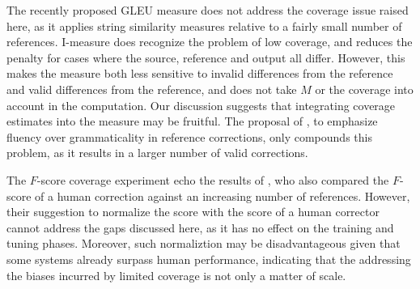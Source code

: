 \documentclass[letterpaper, 11pt]{article}
\newcommand{\lc}[1]{\footnote{\color{blue}LC: #1}}
\begin{document}
The recently proposed GLEU \cite{napoles2015ground} measure does not address
the coverage issue raised here, as it applies string similarity measures relative to a fairly small
number of references. {\sc I-measure} \cite{felice2015towards} does recognize the problem of
low coverage, and reduces the penalty for cases where the source, reference and output all differ.
However, this makes the measure both less sensitive to invalid differences from the reference
and valid differences from the reference, and does not take $M$ or the coverage into account in
the computation. Our discussion suggests that integrating coverage estimates into the measure
may be fruitful.
The proposal of , to emphasize fluency over grammaticality in reference corrections, only compounds this problem, as it results in a larger number of valid corrections.

The $F$-score coverage experiment echo the results of ,
who also compared the $F$-score of a human correction against an increasing number of references.
However, their suggestion to normalize the score
with the score of a human corrector cannot address the gaps discussed here,
as it has no effect on the training and tuning phases.
Moreover, such normaliztion may be disadvantageous given that some systems already
surpass human performance,
indicating that the addressing the biases incurred by limited coverage is not only a matter of scale.


\end{document}
